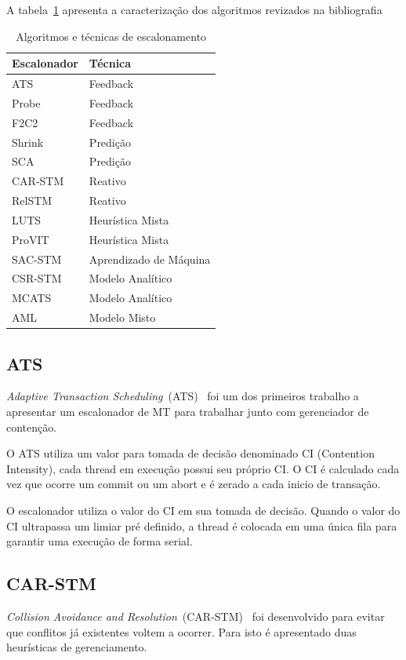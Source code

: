 \documentclass[diss,capa]{texufpel}
\begin{document}
A tabela~\ref{tab:compare} apresenta a caracterização dos algoritmos revizados na bibliografia

\begin{table}[]
\footnotesize
\centering
\caption{Algoritmos e técnicas de escalonamento}
\label{tab:compare}
\begin{tabular}{l|l}
\hline
Escalonador & Técnica \\ \hline
ATS & Feedback \\
Probe & Feedback \\
F2C2 & Feedback \\
Shrink & Predição \\
SCA & Predição \\
CAR-STM & Reativo \\
RelSTM & Reativo \\
LUTS & Heurística Mista \\
ProVIT & Heurística Mista \\
SAC-STM & Aprendizado de Máquina \\
CSR-STM & Modelo Analítico \\
MCATS & Modelo Analítico \\
AML & Modelo Misto \\
\hline
\end{tabular}
\end{table}

\subsection{ATS}

\emph{Adaptive Transaction Scheduling}~(ATS)~\cite{ats2008} foi um dos primeiros trabalho a apresentar um escalonador de MT para trabalhar junto com gerenciador de contenção.

O ATS utiliza um valor para tomada de decisão denominado CI (Contention Intensity), cada thread em execução possui seu próprio CI. O CI é calculado cada vez que ocorre um commit ou um abort e é zerado a cada inicio de transação.

O escalonador utiliza o valor do CI em sua tomada de decisão. Quando o valor do CI ultrapassa um limiar pré definido, a thread é colocada em uma única fila para garantir uma execução de forma serial.

\subsection{CAR-STM}

\emph{Collision Avoidance and Resolution}~(CAR-STM)~\cite{carstm2008} foi desenvolvido para evitar que conflitos já existentes voltem a ocorrer. Para isto é apresentado duas heurísticas de gerenciamento.
\end{document}
